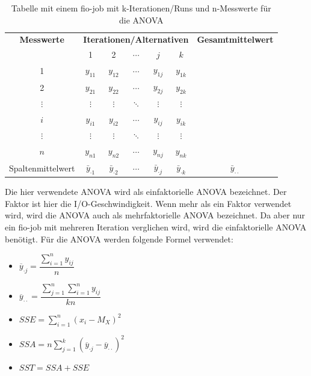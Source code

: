 \begin{table}[h!]
  \centering
  \begin{tabular}{|c|*{5}{c}|c|}
  \hline
  \textbf{Messwerte} & \multicolumn{5}{c|}{\textbf{Iterationen/Alternativen}} & \textbf{Gesamtmittelwert} \\
  \cline{2-6}
   & 1 & 2 & $\cdots$ & $j$ & $k$ & \\
  \hline
  1 & $y_{11}$ & $y_{12}$ & $\cdots$ & $y_{1j}$ & $y_{1k}$ & \\
  2 & $y_{21}$ & $y_{22}$ & $\cdots$ & $y_{2j}$ & $y_{2k}$ & \\
  $\vdots$ & $\vdots$ & $\vdots$ & $\ddots$ & $\vdots$ & $\vdots$ & \\
  $i$ & $y_{i1}$ & $y_{i2}$ & $\cdots$ & $y_{ij}$ & $y_{ik}$ & \\
  $\vdots$ & $\vdots$ & $\vdots$ & $\ddots$ & $\vdots$ & $\vdots$ & \\
  $n$ & $y_{n1}$ & $y_{n2}$ & $\cdots$ & $y_{nj}$ & $y_{nk}$ &  \\
  \hline
  Spaltenmittelwert & $\bar{y}_{\cdot1}$ & $\bar{y}_{\cdot2}$ & $\cdots$ & $\bar{y}_{\cdot j}$ & $\bar{y}_{\cdot k}$ & $\bar{y}_{\cdot \cdot}$ \\
  \hline
  \end{tabular}
  \caption{Tabelle mit einem fio-job mit k-Iterationen/Runs und n-Messwerte für die ANOVA}
  \label{tab:measurements}
\end{table}

Die hier verwendete ANOVA wird als einfaktorielle ANOVA bezeichnet.
Der Faktor ist hier die I/O-Geschwindigkeit. Wenn mehr als ein Faktor verwendet wird, wird die ANOVA auch als mehrfaktorielle ANOVA bezeichnet.
Da aber nur ein fio-job mit mehreren Iteration verglichen wird, wird die einfaktorielle ANOVA benötigt.
Für die ANOVA werden folgende Formel verwendet:

\begin{itemize}
  \item $\overline{y}_{\cdot j} = \dfrac{\sum_{i=1}^{n} y_{ij}}{n}$
  \item $\overline{y}_{\cdot \cdot} = \dfrac{\sum_{j=1}^{n} \sum_{i=1}^{n} y_{ij}}{kn}$
  \item $SSE =  \sum_{i=1}^{n} (x_i - M_X)^2$
  \item $SSA = n \sum_{j=1}^{k} (\overline{y}_{\cdot j} - \overline{y}_{\cdot \cdot})^2$
  \item $SST = SSA + SSE$
\end{itemize}


